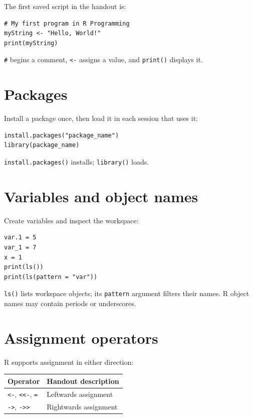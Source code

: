 \begin{workedexample}
The first saved script in the handout is:
\begin{lstlisting}[style=dsr]
# My first program in R Programming
myString <- "Hello, World!"
print(myString)
\end{lstlisting}
\texttt{\#} begins a comment, \texttt{<-} assigns a value, and \texttt{print()} displays it.
\end{workedexample}

\section{Packages}

Install a package once, then load it in each session that uses it:

\begin{lstlisting}[style=dsr]
install.packages("package_name")
library(package_name)
\end{lstlisting}

\texttt{install.packages()} installs; \texttt{library()} loads.

\section{Variables and object names}

Create variables and inspect the workspace:

\begin{lstlisting}[style=dsr]
var.1 = 5
var_1 = 7
x = 1
print(ls())
print(ls(pattern = "var"))
\end{lstlisting}

\texttt{ls()} lists workspace objects; its \texttt{pattern} argument filters their names. R object names may contain periods or underscores.

\section{Assignment operators}

R supports assignment in either direction:

\begin{dstable}
\begin{tabularx}{\linewidth}{@{}p{3.3cm}X@{}}
\toprule
\rowcolor{DSPaleBlue!92}
Operator & Handout description \\
\midrule
\texttt{<-}, \texttt{<<-}, \texttt{=} & Leftwards assignment \\
\texttt{->}, \texttt{->>} & Rightwards assignment \\
\bottomrule
\end{tabularx}
\end{dstable}

